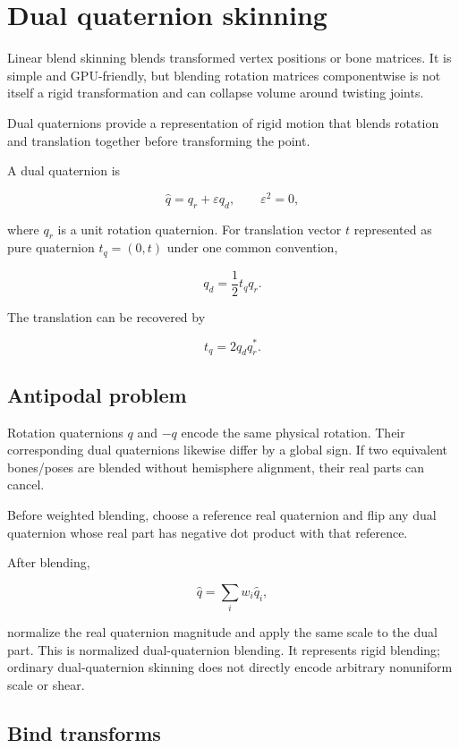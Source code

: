 \hypertarget{appendix-921f3f2efb53}{}
\section{Dual quaternion skinning}\label{appendix-921f3f2efb53-dual-quaternion-skinning}

Linear blend skinning blends transformed vertex positions or bone matrices. It is simple and GPU-friendly, but blending rotation matrices componentwise is not itself a rigid transformation and can collapse volume around twisting joints.

Dual quaternions provide a representation of rigid motion that blends rotation and translation together before transforming the point.

A dual quaternion is

\[
\hat q=q_r+\varepsilon q_d,
\qquad \varepsilon^2=0,
\]

where \(q_r\) is a unit rotation quaternion. For translation vector \(t\) represented as pure quaternion \(t_q=(0,t)\) under one common convention,

\[
q_d=\frac12 t_q q_r.
\]

The translation can be recovered by

\[
t_q=2q_dq_r^*.
\]

\subsection{Antipodal problem}\label{appendix-921f3f2efb53-antipodal-problem}

Rotation quaternions \(q\) and \(-q\) encode the same physical rotation. Their corresponding dual quaternions likewise differ by a global sign. If two equivalent bones/poses are blended without hemisphere alignment, their real parts can cancel.

Before weighted blending, choose a reference real quaternion and flip any dual quaternion whose real part has negative dot product with that reference.

After blending,

\[
\hat q = \sum_i w_i \hat q_i,
\]

normalize the real quaternion magnitude and apply the same scale to the dual part. This is normalized dual-quaternion blending. It represents rigid blending; ordinary dual-quaternion skinning does not directly encode arbitrary nonuniform scale or shear.

\subsection{Bind transforms}\label{appendix-921f3f2efb53-bind-transforms}

